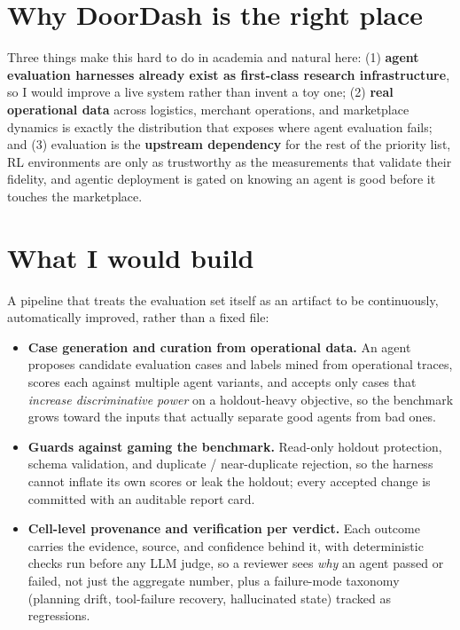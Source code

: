 \documentclass[letterpaper,11pt]{article}
\begin{document}
\section{Why DoorDash is the right place}
Three things make this hard to do in academia and natural here: (1) \textbf{agent evaluation harnesses already exist as first-class research infrastructure}, so I would improve a live system rather than invent a toy one; (2) \textbf{real operational data} across logistics, merchant operations, and marketplace dynamics is exactly the distribution that exposes where agent evaluation fails; and (3) evaluation is the \textbf{upstream dependency} for the rest of the priority list, RL environments are only as trustworthy as the measurements that validate their fidelity, and agentic deployment is gated on knowing an agent is good before it touches the marketplace.

\section{What I would build}
A pipeline that treats the evaluation set itself as an artifact to be continuously, automatically improved, rather than a fixed file:
\begin{itemize}[leftmargin=1.4em, itemsep=2pt, topsep=2pt]
  \item \textbf{Case generation and curation from operational data.} An agent proposes candidate evaluation cases and labels mined from operational traces, scores each against multiple agent variants, and accepts only cases that \emph{increase discriminative power} on a holdout-heavy objective, so the benchmark grows toward the inputs that actually separate good agents from bad ones.
  \item \textbf{Guards against gaming the benchmark.} Read-only holdout protection, schema validation, and duplicate / near-duplicate rejection, so the harness cannot inflate its own scores or leak the holdout; every accepted change is committed with an auditable report card.
  \item \textbf{Cell-level provenance and verification per verdict.} Each outcome carries the evidence, source, and confidence behind it, with deterministic checks run before any LLM judge, so a reviewer sees \emph{why} an agent passed or failed, not just the aggregate number, plus a failure-mode taxonomy (planning drift, tool-failure recovery, hallucinated state) tracked as regressions.
\end{itemize}
\end{document}
